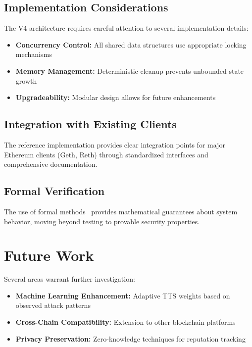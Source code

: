 \documentclass{article}
\begin{document}
\subsection{Implementation Considerations}

The V4 architecture requires careful attention to several implementation details:

\begin{itemize}
\item \textbf{Concurrency Control:} All shared data structures use appropriate locking mechanisms
\item \textbf{Memory Management:} Deterministic cleanup prevents unbounded state growth
\item \textbf{Upgradeability:} Modular design allows for future enhancements
\end{itemize}

\subsection{Integration with Existing Clients}

The reference implementation provides clear integration points for major Ethereum clients (Geth, Reth) through standardized interfaces and comprehensive documentation.

\subsection{Formal Verification}

The use of formal methods~\cite{hildenbrandt2018kevm} provides mathematical guarantees about system behavior, moving beyond testing to provable security properties.

\section{Future Work}

Several areas warrant further investigation:

\begin{itemize}
\item \textbf{Machine Learning Enhancement:} Adaptive TTS weights based on observed attack patterns
\item \textbf{Cross-Chain Compatibility:} Extension to other blockchain platforms
\item \textbf{Privacy Preservation:} Zero-knowledge techniques for reputation tracking
\end{itemize}
\end{document}

